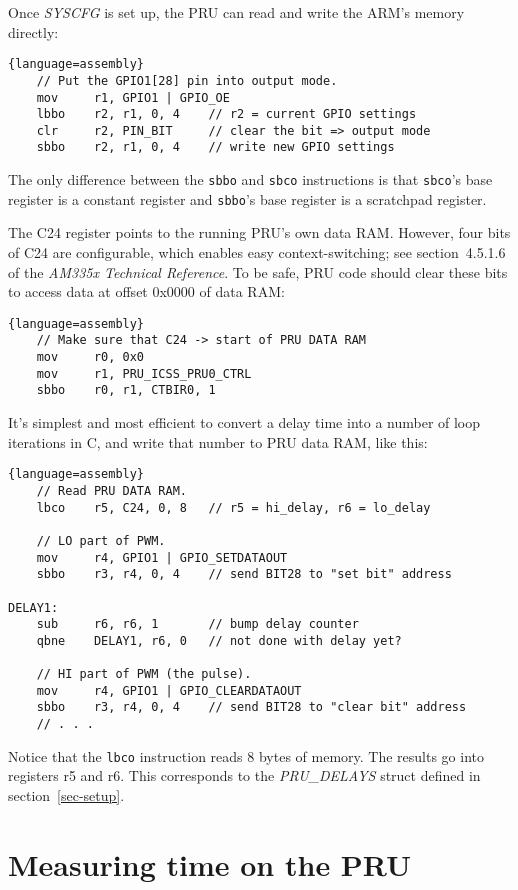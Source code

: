 \documentclass[letterpaper,11pt,fleqn]{article}
\newcommand{\techref}{\textit{AM335x Technical Reference}}
\begin{document}
Once \textit{SYSCFG} is set up, the PRU can read and write the ARM's memory
directly:

\begin{lstlisting}{language=assembly}
    // Put the GPIO1[28] pin into output mode.
    mov     r1, GPIO1 | GPIO_OE
    lbbo    r2, r1, 0, 4    // r2 = current GPIO settings
    clr     r2, PIN_BIT     // clear the bit => output mode
    sbbo    r2, r1, 0, 4    // write new GPIO settings
\end{lstlisting}

The only difference between the \texttt{sbbo} and \texttt{sbco} instructions is
that \texttt{sbco}'s base register is a constant register and \texttt{sbbo}'s
base register is a scratchpad register.

The C24 register points to the running PRU's own data RAM. However, four bits
of C24 are configurable, which enables easy context-switching; see
section~4.5.1.6 of the \techref. To be safe, PRU code should clear these bits
to access data at offset 0x0000 of data RAM:

\begin{lstlisting}{language=assembly}
    // Make sure that C24 -> start of PRU DATA RAM
    mov     r0, 0x0
    mov     r1, PRU_ICSS_PRU0_CTRL
    sbbo    r0, r1, CTBIR0, 1
\end{lstlisting}

It's simplest and most efficient to convert a delay time into a number of
loop iterations in C, and write that number to PRU data RAM, like this:

\begin{lstlisting}{language=assembly}
    // Read PRU DATA RAM.
    lbco    r5, C24, 0, 8   // r5 = hi_delay, r6 = lo_delay

    // LO part of PWM.
    mov     r4, GPIO1 | GPIO_SETDATAOUT
    sbbo    r3, r4, 0, 4    // send BIT28 to "set bit" address

DELAY1:
    sub     r6, r6, 1       // bump delay counter
    qbne    DELAY1, r6, 0   // not done with delay yet?

    // HI part of PWM (the pulse).
    mov     r4, GPIO1 | GPIO_CLEARDATAOUT
    sbbo    r3, r4, 0, 4    // send BIT28 to "clear bit" address
    // . . .
\end{lstlisting}

Notice that the \texttt{lbco} instruction reads 8 bytes of memory. The results
go into registers r5 and r6. This corresponds to the \textit{PRU\_DELAYS}
struct defined in section~\ref{sec-setup}.

\section{Measuring time on the PRU} \label{sec-measuring}
\end{document}
